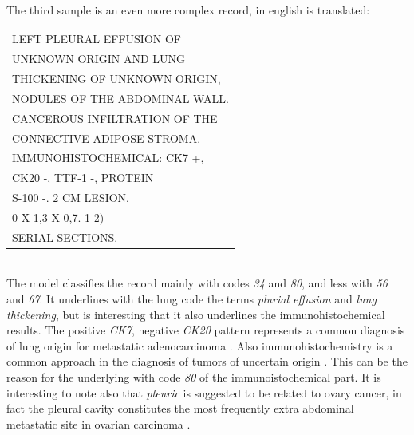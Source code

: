 The third sample is an even more complex record, in english is
translated:\\
\begin{small}
  \ttfamily
  \begin{tabular}{l}
    LEFT PLEURAL EFFUSION OF\\
    UNKNOWN ORIGIN AND LUNG\\
    THICKENING OF UNKNOWN ORIGIN,\\
    NODULES OF THE ABDOMINAL WALL.\\
    CANCEROUS INFILTRATION OF THE\\
    CONNECTIVE-ADIPOSE STROMA.\\
    IMMUNOHISTOCHEMICAL: CK7 +,\\
    CK20 -, TTF-1 -, PROTEIN\\
    S-100 -. 2 CM LESION,\\
    0 X 1,3 X 0,7. 1-2)\\
    SERIAL SECTIONS.
\end{tabular}
\end{small}\\
The model classifies the record mainly with codes \emph{34} and
\emph{80}, and less with \emph{56} and \emph{67}. It underlines with
the lung code the terms
\emph{plurial effusion} and \emph{lung thickening}, but is interesting
that it also underlines the immunohistochemical results. The
positive \emph{CK7}, negative \emph{CK20} pattern represents a common
diagnosis 
of lung origin for metastatic adenocarcinoma
\cite{kummar2002cytokeratin}. Also immunohistochemistry is a common
approach in the diagnosis of tumors of uncertain origin
\cite{duraiyan2012applications}. This can be the reason for the
underlying with code \emph{80} of the immunoistochemical part.
It is interesting to note also that \emph{pleuric} is
suggested to be related to ovary cancer, in fact the pleural cavity
constitutes the most frequently extra abdominal metastatic site in
ovarian carcinoma \cite{porcel2012pleural}.


